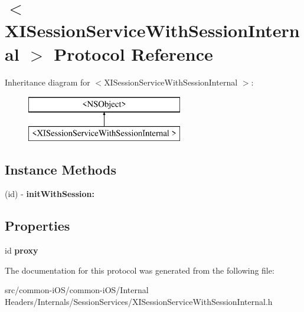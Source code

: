 \hypertarget{protocol_x_i_session_service_with_session_internal_01-p}{}\section{$<$X\+I\+Session\+Service\+With\+Session\+Internal $>$ Protocol Reference}
\label{protocol_x_i_session_service_with_session_internal_01-p}
Inheritance diagram for $<$X\+I\+Session\+Service\+With\+Session\+Internal $>$\+:\begin{figure}[H]
\begin{center}
\leavevmode
\includegraphics[height=2.000000cm]{protocol_x_i_session_service_with_session_internal_01-p}
\end{center}
\end{figure}
\subsection*{Instance Methods}
\begin{DoxyCompactItemize}
\item 
\hypertarget{protocol_x_i_session_service_with_session_internal_01-p_a5649260c051dd61c8d453acc55b660d3}{}\label{protocol_x_i_session_service_with_session_internal_01-p_a5649260c051dd61c8d453acc55b660d3} 
(id) -\/ {\bfseries init\+With\+Session\+:}
\end{DoxyCompactItemize}
\subsection*{Properties}
\begin{DoxyCompactItemize}
\item 
\hypertarget{protocol_x_i_session_service_with_session_internal_01-p_a75185681ab471e18ca760b8825cc26e0}{}\label{protocol_x_i_session_service_with_session_internal_01-p_a75185681ab471e18ca760b8825cc26e0} 
id {\bfseries proxy}
\end{DoxyCompactItemize}


The documentation for this protocol was generated from the following file\+:\begin{DoxyCompactItemize}
\item 
src/common-\/i\+O\+S/common-\/i\+O\+S/\+Internal Headers/\+Internals/\+Session\+Services/X\+I\+Session\+Service\+With\+Session\+Internal.\+h\end{DoxyCompactItemize}
